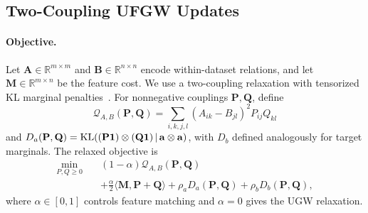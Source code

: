 \subsection{Two-Coupling UFGW Updates}
\label{app:ufgw-extension}

\paragraph{Objective.}
Let $\mathbf A\in\mathbb R^{m\times m}$ and $\mathbf B\in\mathbb R^{n\times n}$ encode within-dataset relations, and let $\mathbf M\in\mathbb R^{m\times n}$ be the feature cost.
We use a two-coupling relaxation with tensorized KL marginal penalties~\citep{sejourne2021unbalanced}.
For nonnegative couplings $\mathbf P,\mathbf Q$, define
\begin{equation*}
\mathcal Q_{A,B}(\mathbf P,\mathbf Q)=\sum_{i,k,j,l}(A_{ik}-B_{jl})^2P_{ij}Q_{kl}
\end{equation*}
and $D_a(\mathbf P,\mathbf Q)=\operatorname{KL}((\mathbf P\mathbf1)\otimes(\mathbf Q\mathbf1)\,|\,\mathbf a\otimes\mathbf a)$, with $D_b$ defined analogously for target marginals.
The relaxed objective is
\begin{equation}
\label{eq:ufgw-relaxation}
\begin{aligned}
\min_{P,Q\geq0}\quad &(1-\alpha)\mathcal Q_{A,B}(\mathbf P,\mathbf Q)\\
&+\frac{\alpha}{2}\langle\mathbf M,\mathbf P+\mathbf Q\rangle+\rho_aD_a(\mathbf P,\mathbf Q)+\rho_bD_b(\mathbf P,\mathbf Q),
\end{aligned}
\end{equation}
where $\alpha\in[0,1]$ controls feature matching and $\alpha=0$ gives the UGW relaxation.

